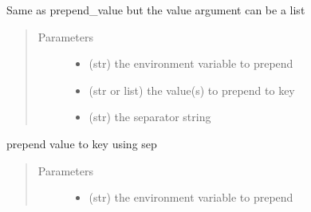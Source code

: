 \documentclass[a4paper,10pt,english]{sphinxmanual}
\begin{document}
\begin{fulllineitems}
\begin{fulllineitems}
\begin{quote}
\begin{description}
\end{description}\end{quote}

\end{fulllineitems}


\begin{fulllineitems}
\label{\detokenize{apidoc_src/src:src.fileEnviron.FileEnviron.prepend}}
Same as prepend\_value but the value argument can be a list
\begin{quote}\begin{description}
\item[{Parameters}] \leavevmode\begin{itemize}
\item {} 
 \textendash{} (str) the environment variable to prepend

\item {} 
 \textendash{} (str or list) the value(s) to prepend to key

\item {} 
 \textendash{} (str) the separator string

\end{itemize}

\end{description}\end{quote}

\end{fulllineitems}


\begin{fulllineitems}
\label{\detokenize{apidoc_src/src:src.fileEnviron.FileEnviron.prepend_value}}
prepend value to key using sep
\begin{quote}\begin{description}
\item[{Parameters}] \leavevmode\begin{itemize}
\item {} 
 \textendash{} (str) the environment variable to prepend


\end{itemize}
\end{description}
\end{quote}
\end{fulllineitems}
\end{fulllineitems}
\end{document}
